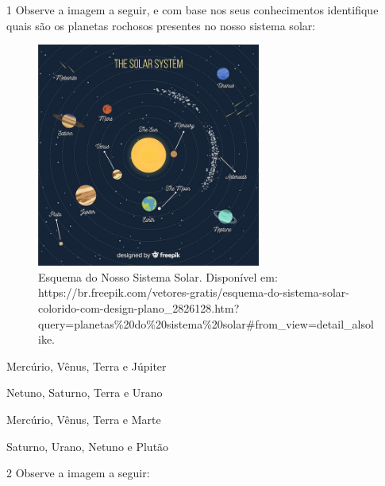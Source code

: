 
\num{1} Observe a imagem a seguir, e com base nos seus conhecimentos identifique quais são os planetas rochosos presentes no nosso sistema solar:

\begin{figure}[htpb!]
\includegraphics[width=2.89583in,height=2.89583in]{./imgs/img12.jpg}
\caption{Esquema do Nosso Sistema Solar. Disponível em:
https://br.freepik.com/vetores-gratis/esquema-do-sistema-solar-colorido-com-design-plano\_2826128.htm?query=planetas\%20do\%20sistema\%20solar\#from\_view=detail\_alsolike.}
\end{figure}

\begin{escolha}
\item
  Mercúrio, Vênus, Terra e Júpiter
\item
  Netuno, Saturno, Terra e Urano
\item
  Mercúrio, Vênus, Terra e Marte
\item
  Saturno, Urano, Netuno e Plutão
\end{escolha}


\num{2} Observe a imagem a seguir:

